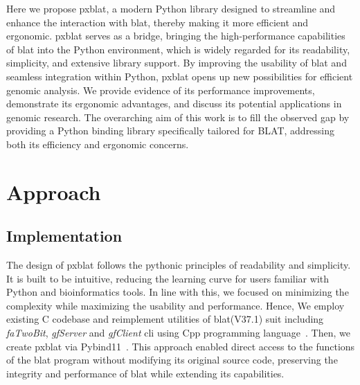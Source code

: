 Here we propose \acrshort{pxblat}, a modern Python library designed to streamline and enhance the interaction with \acrshort{blat}, thereby making it more efficient and ergonomic.
\acrshort{pxblat} serves as a bridge, bringing the high-performance capabilities of \acrshort{blat}  into the Python environment, which is widely regarded for its readability, simplicity, and extensive library support.
By improving the usability of \acrshort{blat}  and seamless integration within Python, \acrshort{pxblat} opens up new possibilities for efficient genomic analysis.
We provide evidence of its performance improvements, demonstrate its ergonomic advantages, and discuss its potential applications in genomic research.
The overarching aim of this work is to fill the observed gap by providing a Python binding library specifically tailored for BLAT, addressing both its efficiency and ergonomic concerns.



\section{Approach}\label{sec:approach}

\subsection*{Implementation}\label{ssec:implementation}


The design of \acrshort{pxblat} follows the pythonic principles of readability and simplicity.
It is built to be intuitive, reducing the learning curve for users familiar with Python and bioinformatics tools.
In line with this, we focused on minimizing the complexity while maximizing the usability and performance.
Hence, We employ existing C codebase and reimplement utilities of \acrshort{blat}(V37.1) suit  including \emph{faTwoBit}, \emph{gfServer} and \emph{gfClient} \acrshort{cli}  using Cpp programming language~\citep{kent2002blat}.
Then, we create \acrshort{pxblat} via Pybind11~\citep{pybind11}.
This approach enabled direct access to the functions of the \acrshort{blat} program without modifying its original source code, preserving the integrity and performance of \acrshort{blat} while extending its capabilities.

